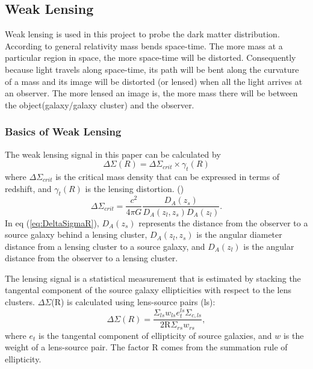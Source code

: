 \documentclass[iop]{emulateapj}
\begin{document}
\subsection{Weak Lensing}

Weak lensing is used in this project to probe the dark matter distribution. According to general relativity mass bends space-time. The more mass at a particular region in space, the more space-time will be distorted. Consequently because light travels along space-time, its path will be bent along the curvature of a mass and its image will be distorted (or lensed) when all the light arrives at an observer.  The more lensed an image is, the more mass there will be between the object(galaxy/galaxy cluster) and the observer.
\subsubsection{Basics of Weak Lensing}

The weak lensing signal in this paper can be calculated by
	\begin{equation}\label{eq:DeltaSigma}
		\Delta \Sigma(R) = \Delta\Sigma_{crit}\times\gamma_{t}(R)
	\end{equation}
where $\Delta\Sigma_{crit}$ is the critical mass density that can be expressed in terms of redshift, and $\gamma_{t}(R)$ is the lensing distortion. (\cite{2015ApJ...806....1M})
	\begin{equation} \label{eq:DeltaSigmaR}
		\Delta\Sigma_{crit} = \frac{c^2} {4\pi G}\frac{D_{A} (z_{s})}{D_{A}(z_l , z_s) D_A (z_l) }.
	\end{equation}
In eq (\ref{eq:DeltaSigmaR}), $D_{A} (z_{s})$ represents the distance from the observer to a source galaxy behind a lensing cluster, $D_{A}(z_l , z_s)$ is the angular diameter distance from a lensing cluster to a source galaxy, and $D_A (z_l)$ is the angular distance from the observer to a lensing cluster.

The lensing signal is a statistical measurement that is estimated by stacking the tangental component of the source galaxy ellipticities with respect to the lens clusters. $\Delta\Sigma$(R) is calculated using lens-source pairs (ls):
	\begin{equation}
		\Delta \Sigma (R) = \frac{\Sigma_{ls}w_{ls} e_t ^{ls} \Sigma_{c,ls} } {2 \mathrm{R} \Sigma_{rs} w_{rs}},
		\label{eq:DeltaSigmaEllip}
	\end{equation}
where $e_t$ is the tangental component of ellipticity of source galaxies, and $w$ is the weight of a lens-source pair. The factor R comes from the summation rule of ellipticity.
\end{document}
